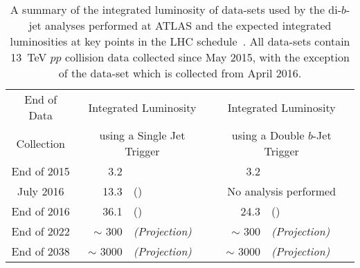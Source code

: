 {\renewcommand{\arraystretch}{1.2}
\begin{table}[!htb]
\centering
\begin{tabular}{|c|r l|r l|}
  \hline
End of Data       & \multicolumn{2}{c|}{Integrated Luminosity}          &   \multicolumn{2}{c|}{Integrated Luminosity}           \\
Collection        &  \multicolumn{2}{c|}{using a Single Jet Trigger}    &   \multicolumn{2}{c|}{using a Double $b$-Jet Trigger}  \\
\hline                                                                    
End of 2015       &  3.2 \ifb{} & \cite{dibjet-mori16_paper}            &  3.2 \ifb{}           & \cite{dibjet-lhcp_conf}          \\
July  2016        & 13.3 \ifb{} & \cite{dibjet-ichep_conf} (\summer{})  &  \multicolumn{2}{c|}{No analysis performed}            \\
End of 2016       & 36.1 \ifb{} & (\hm{})                               &  24.3 \ifb{}          & (\lm{})                          \\
End of 2022       & $\sim$ 300 \ifb{} &  \textit{(Projection)}          &  $\sim$ 300  \ifb{}   &  \textit{(Projection)}           \\
End of 2038       & $\sim$ 3000 \ifb{} & \textit{(Projection)}          &  $\sim$ 3000 \ifb{}   &  \textit{(Projection)}           \\
\hline
\end{tabular}
\caption[A summary of the integrated luminosity of data-sets used by the di-$b$-jet analyses performed at ATLAS and the expected integrated luminosities at key points in the LHC schedule]
        {A summary of the integrated luminosity of data-sets used by the di-$b$-jet analyses performed at ATLAS and the expected integrated luminosities at key points in the LHC schedule~\cite{fut-lhc-shedule}.
          All data-sets contain 13~TeV $pp$ collision data collected since May 2015,
          with the exception of the \lm{} data-set which is collected from April 2016.
        }
\label{tab:fut-lumi}
\end{table}}

